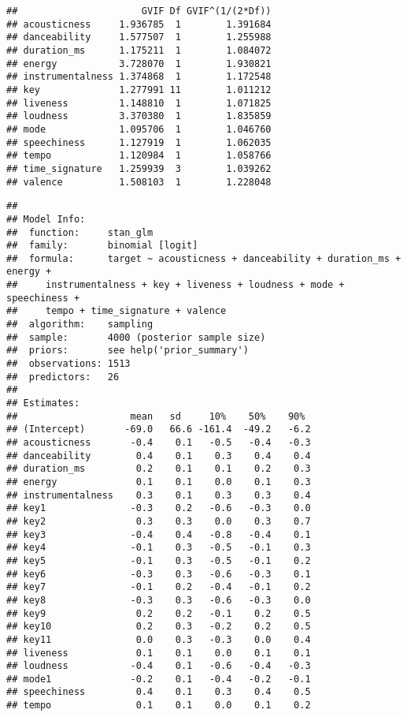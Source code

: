 \documentclass[
]{article}
\begin{document}
\begin{verbatim}
##                      GVIF Df GVIF^(1/(2*Df))
## acousticness     1.936785  1        1.391684
## danceability     1.577507  1        1.255988
## duration_ms      1.175211  1        1.084072
## energy           3.728070  1        1.930821
## instrumentalness 1.374868  1        1.172548
## key              1.277991 11        1.011212
## liveness         1.148810  1        1.071825
## loudness         3.370380  1        1.835859
## mode             1.095706  1        1.046760
## speechiness      1.127919  1        1.062035
## tempo            1.120984  1        1.058766
## time_signature   1.259939  3        1.039262
## valence          1.508103  1        1.228048
\end{verbatim}

\begin{verbatim}
## 
## Model Info:
##  function:     stan_glm
##  family:       binomial [logit]
##  formula:      target ~ acousticness + danceability + duration_ms + energy + 
##     instrumentalness + key + liveness + loudness + mode + speechiness + 
##     tempo + time_signature + valence
##  algorithm:    sampling
##  sample:       4000 (posterior sample size)
##  priors:       see help('prior_summary')
##  observations: 1513
##  predictors:   26
## 
## Estimates:
##                    mean   sd     10%    50%    90% 
## (Intercept)       -69.0   66.6 -161.4  -49.2   -6.2
## acousticness       -0.4    0.1   -0.5   -0.4   -0.3
## danceability        0.4    0.1    0.3    0.4    0.4
## duration_ms         0.2    0.1    0.1    0.2    0.3
## energy              0.1    0.1    0.0    0.1    0.3
## instrumentalness    0.3    0.1    0.3    0.3    0.4
## key1               -0.3    0.2   -0.6   -0.3    0.0
## key2                0.3    0.3    0.0    0.3    0.7
## key3               -0.4    0.4   -0.8   -0.4    0.1
## key4               -0.1    0.3   -0.5   -0.1    0.3
## key5               -0.1    0.3   -0.5   -0.1    0.2
## key6               -0.3    0.3   -0.6   -0.3    0.1
## key7               -0.1    0.2   -0.4   -0.1    0.2
## key8               -0.3    0.3   -0.6   -0.3    0.0
## key9                0.2    0.2   -0.1    0.2    0.5
## key10               0.2    0.3   -0.2    0.2    0.5
## key11               0.0    0.3   -0.3    0.0    0.4
## liveness            0.1    0.1    0.0    0.1    0.1
## loudness           -0.4    0.1   -0.6   -0.4   -0.3
## mode1              -0.2    0.1   -0.4   -0.2   -0.1
## speechiness         0.4    0.1    0.3    0.4    0.5
## tempo               0.1    0.1    0.0    0.1    0.2

\end{verbatim}
\end{document}
